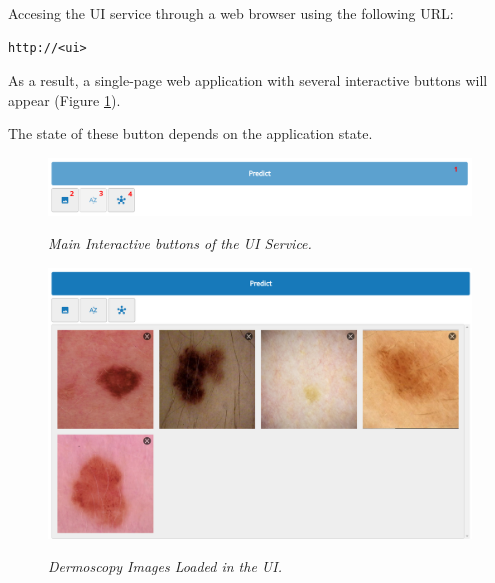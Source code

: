\documentclass[dvipsnames,mathserif]{beamer}
\begin{document}
{\begin{frame}[fragile]
      \footnotesize
      Accesing the UI service through a web browser using the following URL:

      \vspace{0.1cm}

      \begin{Verbatim}[fontsize=\tiny]
http://<ui>
      \end{Verbatim}

      As a result, a single-page web application with several interactive buttons will appear (Figure \ref{fig:ui-tools}).

      \vspace{0.2cm}
      The state of these button depends on the application state.


      \begin{figure}[H]
        \centering
        \includegraphics[width=\textwidth]{images/ui-tools.png}
        \caption[Main Interactive buttons of the UI Service]{\textit{Main Interactive buttons of the UI Service.}}
        {\label{fig:ui-tools}}
      \end{figure}

    \end{frame}


    \begin{frame}

      \begin{figure}[H]
        \centering
        \begin{adjustbox}{width=0.55\textwidth, trim={0cm 2.8cm 0cm 0cm}, clip}
          \includegraphics[width=\textwidth]{images/loaded-images.png}
        \end{adjustbox}
        \caption[Dermoscopy Images Loaded in the UI]{\footnotesize{\textit{Dermoscopy Images
        Loaded in the UI.}}}
        {\label{fig:loaded-images}}


\end{figure}
\end{frame}}
\end{document}
